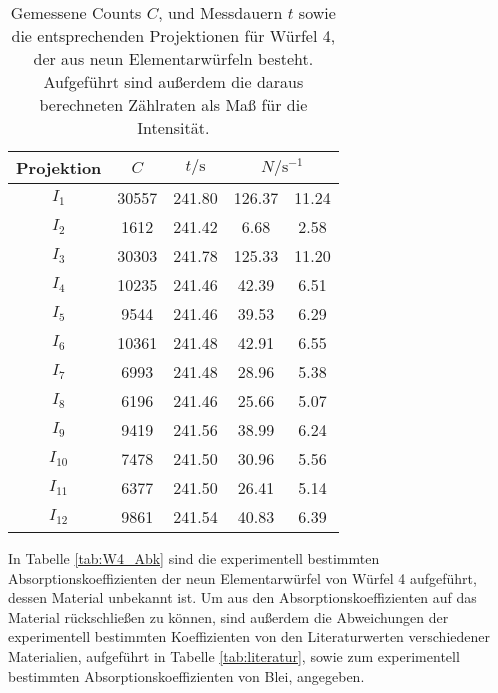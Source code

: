 \begin{table}[h]
    \centering
    \caption{Gemessene Counts $C$, und Messdauern $t$ sowie die entsprechenden Projektionen für Würfel 4, der aus neun Elementarwürfeln
    besteht. Aufgeführt sind außerdem die daraus berechneten Zählraten als Maß für die Intensität.}
    \label{tab:W4}
    \begin{tabular}{c S[table-format=5.0] S[table-format=3.2] S[table-format=3.2]@{${}\pm{}$} S[table-format=2.2]}
        \toprule
        {Projektion} & {$C$} & {$t/\si{\s}$} &  \\
        \midrule
        $I_1$    & 30557 & 241.80 & 126.37 & 11.24 \\
        $I_2$    & 1612  & 241.42 & 6.68   & 2.58  \\
        $I_3$    & 30303 & 241.78 & 125.33 & 11.20 \\
        $I_4$    & 10235 & 241.46 & 42.39  & 6.51  \\
        $I_5$    & 9544  & 241.46 & 39.53  & 6.29  \\
        $I_6$    & 10361 & 241.48 & 42.91  & 6.55  \\
        $I_7$    & 6993  & 241.48 & 28.96  & 5.38  \\
        $I_8$    & 6196  & 241.46 & 25.66  & 5.07  \\
        $I_9$    & 9419  & 241.56 & 38.99  & 6.24  \\
        $I_{10}$ & 7478  & 241.50 & 30.96  & 5.56  \\
        $I_{11}$ & 6377  & 241.50 & 26.41  & 5.14  \\
        $I_{12}$ & 9861  & 241.54 & 40.83  & 6.39  \\
        \bottomrule
    \end{tabular}
\end{table}
\FloatBarrier
\noindent
In Tabelle \ref{tab:W4_Abk} sind die experimentell bestimmten Absorptionskoeffizienten der neun Elementarwürfel von Würfel 4 aufgeführt, dessen
Material unbekannt ist. Um aus den Absorptionskoeffizienten auf das Material rückschließen zu können, sind außerdem
die Abweichungen der experimentell bestimmten Koeffizienten von den Literaturwerten verschiedener Materialien, aufgeführt in 
Tabelle \ref{tab:literatur}, sowie zum experimentell bestimmten Absorptionskoeffizienten von Blei, angegeben. 
\FloatBarrier
